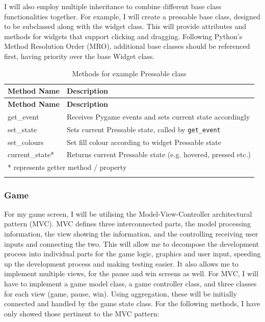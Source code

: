 \documentclass[../main/main.tex]{subfiles}
\begin{document}
I will also employ multiple inheritance to combine different base class functionalities together. For example, I will create a pressable base class, designed to be subclassed along with the widget class. This will provide attributes and methods for widgets that support clicking and dragging. Following Python's Method Resolution Order (MRO), additional base classes should be referenced first, having priority over the base Widget class.

\begin{longtable}[c]{l|l}
    \toprule
    \textbf{Method Name} & \textbf{Description}\\
    \midrule
    \endfirsthead
    \textbf{Method Name} & \textbf{Description}\\
    \midrule
    \endhead

    get\_event & Receives Pygame events and sets current state accordingly\\
    set\_state & Sets current Pressable state, called by \lstinline[language=Python]{get_event}\\
    set\_colours & Set fill colour according to widget Pressable state\\
    current\_state* & Returns current Pressable state (e.g. hovered, pressed etc.)\\

    \midrule

    \multicolumn{2}{l}{* represents getter method / property}\\

    \bottomrule

\caption{Methods for example Pressable class}
\label{tab:pressable-methods}
\end{longtable}

\subsubsection*{Game}
\label{sec:design-mvc}
For my game screen, I will be utilising the Model-View-Controller architectural pattern (MVC). MVC defines three interconnected parts, the model processing information, the view showing the information, and the controlling receiving user inputs and connecting the two. This will allow me to decompose the development process into individual parts for the game logic, graphics and user input, speeding up the development process and making testing easier. It also allows me to implement multiple views, for the pause and win screens as well. For MVC, I will have to implement a game model class, a game controller class, and three classes for each view (game, pause, win). Using aggregation, these will be initially connected and handled by the game state class. For the following methods, I have only showed those pertinent to the MVC pattern:
\end{document}

